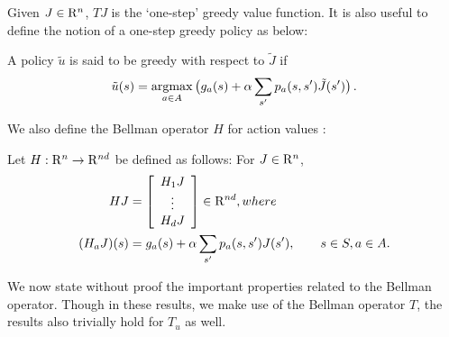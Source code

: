 Given $J \in \mathrm{R}^n$, $TJ$ is the `one-step' greedy value function. It is also useful to define the notion of a one-step greedy policy as below:
\begin{definition}
A policy $\tilde{u}$ is said to be greedy with respect to $\tilde{J}$ if
\begin{align}\label{subpol}
\tilde{u}(s)=\underset{a \in A}{\argmax} \, \big(g_a(s)+\alpha\sum_{s'} p_a(s,s')\tilde{J}(s')\big)\,.
\end{align}
\end{definition}
We also define the Bellman operator $H$ for action values  \cite{BertB}: 
\begin{definition}\label{bellactval}
Let $H: \mathrm{R}^n \to \mathrm{R}^{nd}$ be defined as follows: For $J\in \mathrm{R}^n$,
\begin{align}
HJ&=\left[ {\begin{array}{c} H_1 J  \\ \vdots \\ H_d J\end{array}} \right]\in \mathrm{R}^{nd},\relax{where}\nonumber\\
(H_a J)(s)&= g_a(s)+\alpha \sum_{s'}p_a(s,s') J(s'), \qquad s\in S, a\in A.
\end{align}
\end{definition}
 We now state without proof the important properties related to the Bellman operator. Though in these results, we make use of the Bellman operator $T$, the results also trivially hold for $T_u$ as well.
